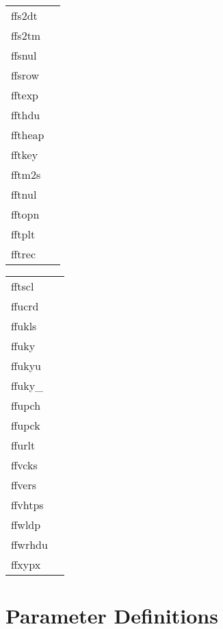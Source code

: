 \documentclass[11pt]{book}
\begin{document}
\begin{tabular}{lr}
ffs2dt  & \pageref{ffdt2s} \\
ffs2tm  & \pageref{ffdt2s} \\
ffsnul   & \pageref{ffsnul} \\
ffsrow  & \pageref{ffsrow} \\
fftexp    & \pageref{fftexp} \\
ffthdu   & \pageref{ffthdu} \\
fftheap  & \pageref{fftheap} \\
fftkey   & \pageref{fftkey} \\
fftm2s  & \pageref{ffdt2s} \\
fftnul   & \pageref{fftnul} \\
fftopn & \pageref{ffopen} \\
fftplt & \pageref{fftplt} \\
fftrec    & \pageref{fftrec} \\


\end{tabular}
\newpage
\begin{tabular}{lr}

fftscl     & \pageref{fftscl} \\
ffucrd       & \pageref{ffucrd} \\
ffukls    & \pageref{ffukyx} \\
ffuky        & \pageref{ffuky} \\
ffukyu   & \pageref{ffukyu} \\
ffuky\_    & \pageref{ffukyx} \\
ffupch      & \pageref{ffupch} \\
ffupck  & \pageref{ffupck} \\
ffurlt  & \pageref{ffurlt} \\
ffvcks  & \pageref{ffvcks} \\
ffvers    & \pageref{ffvers} \\
ffvhtps  & \pageref{ffvhtps} \\
ffwldp & \pageref{ffwldp} \\
ffwrhdu  & \pageref{ffwrhdu} \\
ffxypx & \pageref{ffxypx} \\

\end{tabular}


\chapter{Parameter Definitions }
\end{document}
